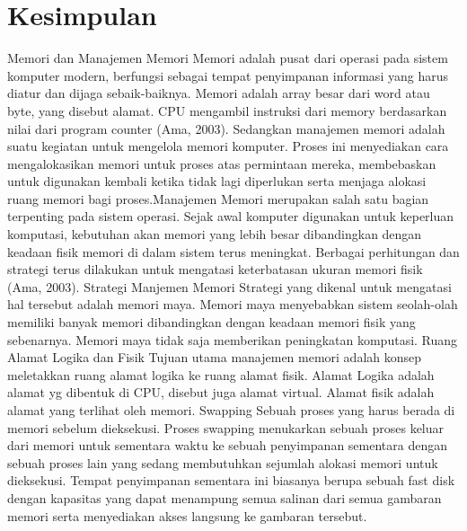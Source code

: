 \section {Kesimpulan}
Memori dan Manajemen Memori
Memori adalah pusat dari operasi pada sistem komputer modern, berfungsi sebagai tempat penyimpanan informasi yang harus diatur dan dijaga sebaik-baiknya. Memori adalah array besar dari word atau byte, yang disebut alamat. CPU mengambil instruksi dari memory berdasarkan nilai dari program counter (Ama, 2003).
Sedangkan manajemen memori adalah suatu kegiatan untuk mengelola memori komputer. Proses ini menyediakan cara mengalokasikan memori untuk proses atas permintaan mereka, membebaskan untuk digunakan kembali ketika tidak lagi diperlukan serta menjaga alokasi ruang memori bagi proses.Manajemen Memori merupakan salah satu bagian terpenting pada sistem operasi. Sejak awal komputer digunakan untuk keperluan komputasi, kebutuhan akan memori yang lebih besar dibandingkan dengan keadaan fisik memori di dalam sistem terus meningkat. Berbagai perhitungan dan strategi terus dilakukan untuk mengatasi keterbatasan ukuran memori fisik (Ama, 2003).
Strategi Manjemen Memori
Strategi yang dikenal untuk mengatasi hal tersebut adalah memori maya. Memori maya menyebabkan sistem seolah-olah memiliki banyak memori dibandingkan dengan keadaan memori fisik yang sebenarnya. Memori maya tidak saja memberikan peningkatan komputasi.
Ruang Alamat Logika dan Fisik
Tujuan utama manajemen memori adalah konsep meletakkan ruang alamat logika ke ruang alamat fisik. Alamat Logika adalah alamat yg dibentuk di CPU, disebut juga alamat virtual. Alamat fisik adalah alamat yang terlihat oleh memori.
Swapping
Sebuah proses yang harus berada di memori sebelum dieksekusi. Proses swapping menukarkan sebuah proses keluar dari memori untuk sementara waktu ke sebuah penyimpanan sementara dengan sebuah proses lain yang sedang membutuhkan sejumlah alokasi memori untuk dieksekusi. Tempat penyimpanan sementara ini biasanya berupa sebuah fast disk dengan kapasitas yang dapat menampung semua salinan dari semua gambaran memori serta menyediakan akses langsung ke gambaran tersebut.
